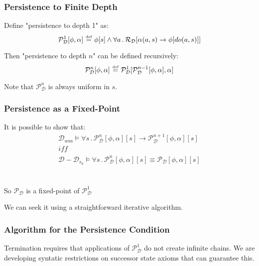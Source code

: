 \documentclass[compress]{beamer}
\newcommand{\isdef}{\hbox{$\stackrel{\mbox{\tiny def}}{=}$}}
\begin{document}
\begin{frame}
\frametitle{Persistence to Finite Depth}
Define "persistence to depth 1" as:
\begin{equation*}
  \mathcal{P}^1_{\mathcal{D}}[\phi,\alpha]\,\,\isdef\,\,\phi[s] \wedge \forall a\,.\,\mathcal{R}_{\mathcal{D}}[\alpha(a,s)\rightarrow \phi[do(a,s)]]
\end{equation*}

Then "persistence to depth $n$" can be defined recursively:
\begin{equation*}
  \mathcal{P}^n_{\mathcal{D}}[\phi,\alpha]\,\,\isdef\,\,\mathcal{P}^1_{\mathcal{D}}[\mathcal{P}^{n-1}_{\mathcal{D}}[\phi,\alpha],\alpha]
\end{equation*}

Note that $\mathcal{P}^{n}_{\mathcal{D}}$ is always uniform in $s$.
\end{frame}

\begin{frame}
\frametitle{Persistence as a Fixed-Point}
It is possible to show that:
\begin{gather*}
\mathcal{D}_{una}\models\forall s\,.\,\mathcal{P}_{\mathcal{D}}^{n}[\phi,\alpha][s]\rightarrow\mathcal{P}_{\mathcal{D}}^{n+1}[\phi,\alpha][s]\label{eqn:pn_persists}\\
\mathit{iff}\nonumber \\
\mathcal{D}-\mathcal{D}_{s_{0}}\models\forall s\,.\,\mathcal{P}_{\mathcal{D}}^{n}[\phi,\alpha][s]\equiv\mathcal{P_{D}}[\phi,\alpha][s]\label{eqn:pn_equiv_persists}
\end{gather*}
\ \\
\ \\
So $\mathcal{P}_{\mathcal{D}}$ is a fixed-point of $\mathcal{P}^1_{\mathcal{D}}$

We can seek it using a straightforward iterative algorithm.
\end{frame}

\begin{frame}
\frametitle{Algorithm for the Persistence Condition}

Termination requires that applications of $\mathcal{P}^1_{\mathcal{D}}$ do not create infinite chains.  We are developing syntatic restrictions on successor state axioms that can guarantee this.
\end{frame}
\end{document}
